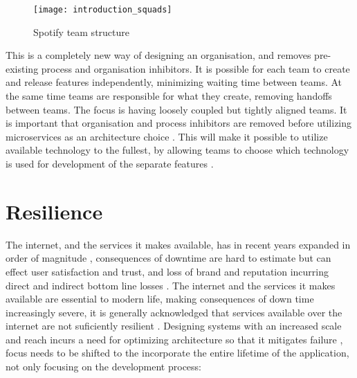 \begin{figure}[!htb]
  \begin{center} 
	  \texttt{[image: introduction\_squads]}  
  \end{center}
  \caption{Spotify team structure}
  \label{fig:introduction_squads}
\end{figure}

This is a completely new way of designing an organisation, and removes pre-existing process and organisation inhibitors. It is possible for each team to create and release features independently, minimizing waiting time between teams. At the same time teams are responsible for what they create, removing handoffs between teams. The focus is having loosely coupled but tightly aligned teams.
It is important that organisation and process inhibitors are removed before utilizing microservices as an architecture choice \cite{meshenberg2016microservices}. This will make it possible to utilize available technology to the fullest, by allowing teams to choose which technology is used for development of the separate features \cite{fowler2014polyglot}. 


\section{Resilience}
The internet, and the services it makes available, has in recent years expanded in order of magnitude \cite[p.~4]{nygard2007release}, consequences of downtime are hard to estimate but can effect user satisfaction and trust, and loss of brand and reputation incurring direct and indirect bottom line losses \cite[p.~26]{beyer2016siteReliabilityEngineering}. The internet and the services it makes available are essential to modern life, making consequences of down time increasingly severe, it is generally acknowledged that services available over the internet are not suficiently resilient \cite{sterbenz2010resilience}. Designing systems with an increased scale and reach incurs a need for optimizing architecture so that it mitigates failure \cite[p.~4]{nygard2007release}, focus needs to be shifted to the incorporate the entire lifetime of the application, not only focusing on the development process:


